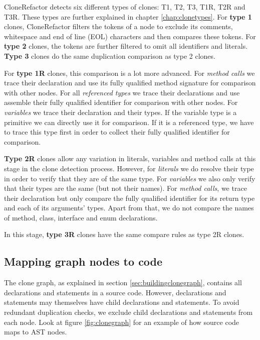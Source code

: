 CloneRefactor detects six different types of clones: T1, T2, T3, T1R, T2R and T3R. These types are further explained in chapter \ref{chap:clonetypes}. For \textbf{type 1} clones, CloneRefactor filters the tokens of a node to exclude its comments, whitespace and end of line (EOL) characters and then compares these tokens. For \textbf{type 2} clones, the tokens are further filtered to omit all identifiers and literals. \textbf{Type 3} clones do the same duplication comparison as type 2 clones.

For \textbf{type 1R} clones, this comparison is a lot more advanced. For \textit{method calls} we trace their declaration and use its fully qualified method signature for comparison with other nodes. For all \textit{referenced types} we trace their declarations and use assemble their fully qualified identifier for comparison with other nodes. For \textit{variables} we trace their declaration and their types. If the variable type is a primitive we can directly use it for comparison. If it is a referenced type, we have to trace this type first in order to collect their fully qualified identifier for comparison.

\textbf{Type 2R} clones allow any variation in literals, variables and method calls at this stage in the clone detection process. However, for \textit{literals} we do resolve their type in order to verify that they are of the same type. For \textit{variables} we also only verify that their types are the same (but not their names). For \textit{method calls}, we trace their declaration but only compare the fully qualified identifier for its return type and each of its arguments' types. Apart from that, we do not compare the names of method, class, interface and enum declarations.

In this stage, \textbf{type 3R} clones have the same compare rules as type 2R clones.

\subsection{Mapping graph nodes to code}
The clone graph, as explained in section \ref{sec:buildingclonegraph}, contains all declarations and statements in a source code. However, declarations and statements may themselves have child declarations and statements. To avoid redundant duplication checks, we exclude child declarations and statements from each node. Look at figure \ref{fig:clonegraph} for an example of how source code maps to AST nodes.

